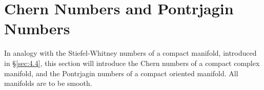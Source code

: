 \documentclass[../main]{subfiles}
\begin{document}
\chapter{Chern Numbers and Pontrjagin Numbers}\label{ch:16}
In analogy with the Stiefel-Whitney numbers of a compact manifold, introduced in \S\ref{sec:4.4}, this section will introduce the Chern numbers of a compact complex manifold, and the Pontrjagin numbers of a compact oriented manifold. All manifolds are to be smooth.







\end{document}
